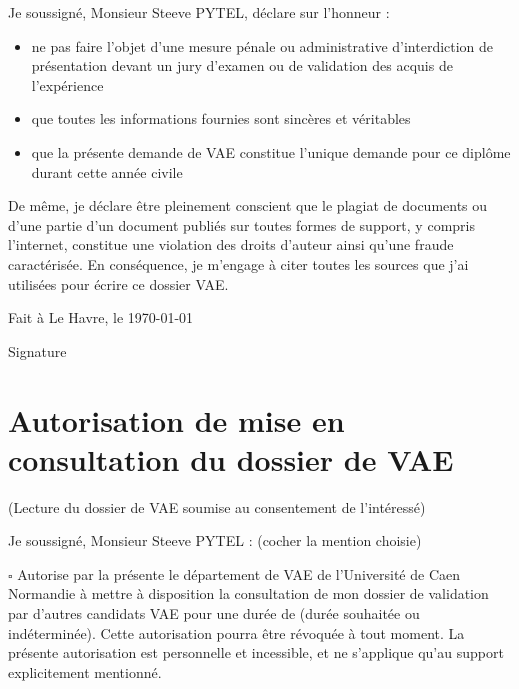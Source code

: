 \documentclass[12pt,a4paper]{report}
\begin{document}
Je soussigné, Monsieur Steeve PYTEL, déclare sur l'honneur :

\begin{itemize}[leftmargin=*]
    \item ne pas faire l'objet d'une mesure pénale ou administrative d'interdiction de présentation devant un jury d'examen ou de validation des acquis de l'expérience
    \item que toutes les informations fournies sont sincères et véritables
    \item que la présente demande de VAE constitue l'unique demande pour ce diplôme durant cette année civile
\end{itemize}

De même, je déclare être pleinement conscient que le plagiat de documents ou d'une partie d'un document publiés sur toutes formes de support, y compris l'internet, constitue une violation des droits d'auteur ainsi qu'une fraude caractérisée. En conséquence, je m'engage à citer toutes les sources que j'ai utilisées pour écrire ce dossier VAE.

\vspace{2cm}

Fait à Le Havre, le \today

\vspace{1.5cm}

Signature

\vspace{2cm}



\newpage


\chapter*{Autorisation de mise en consultation du dossier de VAE}

(Lecture du dossier de VAE soumise au consentement de l'intéressé)

Je soussigné, Monsieur Steeve PYTEL : (cocher la mention choisie)

\vspace{0.5cm}

$\square$ Autorise par la présente le département de VAE de l'Université de Caen Normandie à mettre à disposition la consultation de mon dossier de validation par d'autres candidats VAE pour une durée de \makebox[4cm]{\dotfill} (durée souhaitée ou indéterminée). Cette autorisation pourra être révoquée à tout moment. La présente autorisation est personnelle et incessible, et ne s'applique qu'au support explicitement mentionné.
\end{document}
